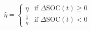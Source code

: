 \begin{equation}
\hat{\eta} =
	\begin{cases}
		\eta &\text{if } \Delta\text{SOC}(t) \geq 0 \\
		\frac{1}{\eta} &\text{if } \Delta\text{SOC}(t) < 0
	\end{cases}
\label{ch4:equ:energy-conversion-adjustment}
\end{equation}

